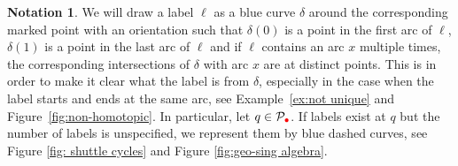 \documentclass[11pt]{amsart}
\numberwithin{equation}{section}
\theoremstyle{definition}
\newtheorem{notation}[theorem]{Notation}
\newcommand{\rpoint}{\color{red}{\bullet}}
\begin{document}
\begin{notation}
We will draw a label $\ell$ as a blue curve $\delta$ around the corresponding marked point with an orientation such that $\delta (0)$ is a point in the first arc of $\ell$, $\delta (1)$ is a point in the last arc of $\ell$ and if $\ell$ contains an arc ${x}$ multiple times, the corresponding intersections of $\delta$ with arc ${x}$ are at distinct points. This is in order to make it clear what the label is from $\delta$, especially in the case when the label starts and ends at the same arc, see Example~\ref{ex:not unique} and Figure~\ref{fig:non-homotopic}. In particular, let \( q \in \mathcal{P}_{\rpoint} \). If labels exist at \( q \) but the number of labels is unspecified, we represent them by blue dashed curves, see Figure \ref{fig: shuttle cycles} and Figure \ref{fig:geo-sing algebra}.
\end{notation}
\end{document}

